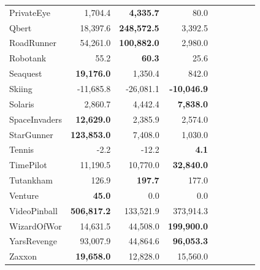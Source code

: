 \begin{table}[ht]
\begin{center}
\begin{small}
\begin{tabular}{lrrrrrrrl}
PrivateEye       & 1,704.4                 & \textbf{4,335.7}        & 80.0                 \\
Qbert            & 18,397.6                & \textbf{248,572.5}      & 3,392.5              \\
RoadRunner       & 54,261.0                & \textbf{100,882.0}      & 2,980.0              \\
Robotank         & 55.2                    & \textbf{60.3}           & 25.6                 \\
Seaquest         & \textbf{19,176.0}       & 1,350.4                 & 842.0                \\
Skiing           & -11,685.8               & -26,081.1               & \textbf{-10,046.9}   \\
Solaris          & 2,860.7                 & 4,442.4                 & \textbf{7,838.0}     \\
SpaceInvaders    & \textbf{12,629.0}       & 2,385.9                 & 2,574.0              \\
StarGunner       & \textbf{123,853.0}      & 7,408.0                 & 1,030.0              \\
Tennis           & -2.2                    & -12.2                   & \textbf{4.1}         \\
TimePilot        & 11,190.5                & 10,770.0                & \textbf{32,840.0}    \\
Tutankham        & 126.9                   & \textbf{197.7}          & 177.0                \\
Venture          & \textbf{45.0}           & 0.0                     & 0.0                  \\
VideoPinball     & \textbf{506,817.2}      & 133,521.9               & 373,914.3            \\
WizardOfWor      & 14,631.5                & 44,508.0                & \textbf{199,900.0}   \\
YarsRevenge      & 93,007.9                & 44,864.6                & \textbf{96,053.3}    \\
Zaxxon           & \textbf{19,658.0}       & 12,828.0                & 15,560.0             \\


\end{tabular}
\end{small}
\end{center}
\end{table}
